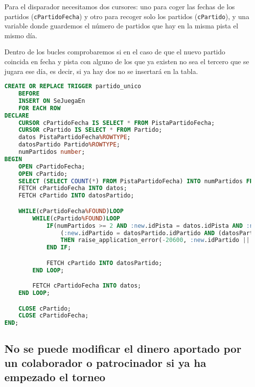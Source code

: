 Para el disparador necesitamos dos cursores: uno para coger las fechas de los partidos
(\texttt{cPartidoFecha}) y otro para recoger solo los partidos (\texttt{cPartido}),
y una variable donde guardemos el número de partidos que hay en la misma pista el mismo día.

Dentro de los bucles comprobaremos si en el caso de que el nuevo partido coincida en fecha
y pista con alguno de los que ya existen no sea el tercero que se jugara ese día, es decir,
si ya hay dos no se insertará en la tabla.

\begin{lstlisting}[language=sql]
CREATE OR REPLACE TRIGGER partido_unico
	BEFORE
	INSERT ON SeJuegaEn
	FOR EACH ROW
DECLARE
	CURSOR cPartidoFecha IS SELECT * FROM PistaPartidoFecha;
	CURSOR cPartido IS SELECT * FROM Partido;
	datos PistaPartidoFecha%ROWTYPE;
	datosPartido Partido%ROWTYPE;
	numPartidos number;
BEGIN
	OPEN cPartidoFecha;
	OPEN cPartido;
	SELECT (SELECT COUNT(*) FROM PistaPartidoFecha) INTO numPartidos FROM dual;
	FETCH cPartidoFecha INTO datos;
	FETCH cPartido INTO datosPartido;

	WHILE(cPartidoFecha%FOUND)LOOP
		WHILE(cPartido%FOUND)LOOP
			IF(numPartidos >= 2 AND :new.idPista = datos.idPista AND :new.idPartido <> datos.idPartido AND
				(:new.idPartido = datosPartido.idPartido AND (datosPartido.fecha-datos.fecha) < 1))
				THEN raise_application_error(-20600, :new.idPartido || 'No se jugar más de dos partidos en la misma pista en un mismo dia');
			END IF;

			FETCH cPartido INTO datosPartido;
		END LOOP;

		FETCH cPartidoFecha INTO datos;
	END LOOP;

	CLOSE cPartido;
	CLOSE cPartidoFecha;
END;
\end{lstlisting}

\subsection{No se puede modificar el dinero aportado por un colaborador o patrocinador si ya ha empezado el torneo}

